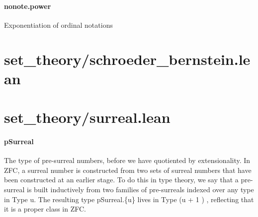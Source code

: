 \documentclass{article}
\begin{document}
\paragraph{nonote.power}
\par
Exponentiation of ordinal notations
\section{set\_theory/schroeder\_bernstein.lean}\section{set\_theory/surreal.lean}\paragraph{pSurreal}
\par
The type of pre-surreal numbers, before we have quotiented
by extensionality. In ZFC, a surreal number is constructed from
two sets of surreal numbers that have been constructed at an earlier
stage. To do this in type theory, we say that a pre-surreal is built
inductively from two families of pre-surreals indexed over any type
in Type u. The resulting type 
\colorbox[RGB]{253,246,227}{{{{\color[RGB]{101, 123, 131} pSurreal.\{u\} }}}} lives in 
\colorbox[RGB]{253,246,227}{{{{\color[RGB]{38, 139, 210} Type }}}{{{\color[RGB]{101, 123, 131}  (u }}}{{{\color[RGB]{181, 137, 0} + }}}{{{\color[RGB]{108, 113, 196} 1 }}}{{{\color[RGB]{101, 123, 131} ) }}}},
reflecting that it is a proper class in ZFC.
\end{document}
